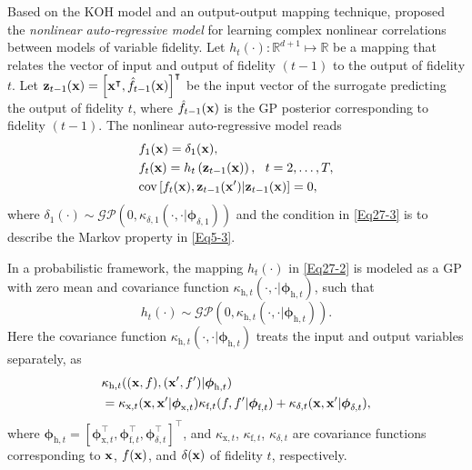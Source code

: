 \documentclass[iicol,sn-basic]{sn-jnl}%
\begin{document}
Based on the KOH model and an output-output mapping technique, \cite{Perdikaris2017} proposed the \textit{nonlinear auto-regressive model} for learning complex nonlinear correlations between models of variable fidelity.
Let $h_{t}(\cdot):\mathbb{R}^{d+1} \mapsto \mathbb{R}$ be a mapping that relates the vector of input and output of fidelity $(t-1)$ to the output of fidelity $t$.
Let ${\bf z}_{t-1}({\bf x})=\left[{\bf x}^\intercal,\hat{f}_{t-1}({\bf x})\right]^\intercal$ be the input vector of the surrogate predicting the output of fidelity $t$, where $\hat{f}_{t-1}({\bf x})$ is the GP posterior corresponding to fidelity $(t-1)$.
The nonlinear auto-regressive model reads~\citep{Perdikaris2017}
\begin{subequations}\label{Eq27}
	\begin{align}
		&f_1({\bf x})=\delta_1({\bf x}) \label{Eq27-1},\\
		&f_{t}({\bf x})=h_{t}\left({{\bf z}_{t-1}({\bf x})}\right), \ \  t=2,\dots,T \label{Eq27-2},\\
		&\text{cov}\left[f_{t}({\bf x}),{\bf z}_{t-1}({\bf x}')|{\bf z}_{t-1}({\bf x})\right]=0 
		\label{Eq27-3},
	\end{align}
\end{subequations}
where $\delta_1(\cdot) \sim \mathcal{GP}\left(0, \kappa_{\delta,1}(\cdot,\cdot|{\boldsymbol \phi}_{\delta,1})\right)$ and the condition in \cref{Eq27-3} is to describe the Markov property in \cref{Eq5-3}.

In a probabilistic framework, the mapping $h_{t}(\cdot)$ in \cref{Eq27-2} is modeled as a GP with zero mean and covariance function $\kappa_{\text{h},t}(\cdot,\cdot|{\boldsymbol \phi}_{\text{h},t})$, such that
\begin{equation}\label{Eq28}
	h_{t}(\cdot) \sim \mathcal{GP}\left(0, \kappa_{\text{h},t}(\cdot,\cdot|{\boldsymbol \phi}_{\text{h},t})\right).
\end{equation} 
Here the covariance function $\kappa_{\text{h},t}(\cdot,\cdot|{\boldsymbol \phi}_{\text{h},t})$ treats the input and output variables separately, as
\begin{equation}\label{Eq29}
	\begin{aligned}
		&\kappa_{\text{h},t}(({\bf x},f),({\bf x'},f')|{\boldsymbol \phi}_{\text{h},t})\\  
		& =\kappa_{\text{x},t}({\bf x},{\bf x}'|{\boldsymbol \phi}_{\text{x},t})\kappa_{\text{f},t}(f,f'|{\boldsymbol \phi}_{\text{f},t}) + \kappa_{\delta,t}({\bf x},{\bf x}'|{\boldsymbol \phi}_{\delta,t}),
	\end{aligned}
\end{equation}
where ${\boldsymbol \phi}_{\text{h},t}=[{\boldsymbol \phi}_{\text{x},t}^\intercal,{\boldsymbol \phi}_{\text{f},t}^\intercal,{\boldsymbol \phi}_{\delta,t}^\intercal]^\intercal$, and $\kappa_{\text{x},t}$, $\kappa_{\text{f},t}$, $\kappa_{\delta,t}$ are covariance functions corresponding to ${\bf x}$, $f({\bf x})$, and $\delta({\bf x})$ of fidelity $t$, respectively.
\end{document}
